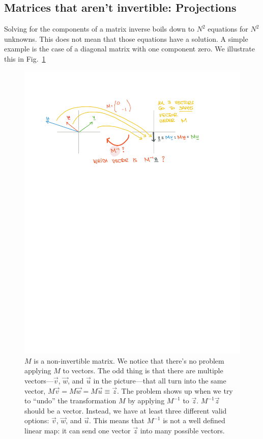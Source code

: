 \documentclass[12pt]{article}
\begin{document}
\subsection{Matrices that aren't invertible: Projections}

Solving for the components of a matrix inverse boils down to $N^2$ equations for $N^2$ unknowns. This does not mean that those equations have a solution. A simple example is the case of a diagonal matrix with one component zero. We illustrate this in Fig.~\ref{fig:map:M:no:inv}
\begin{figure}[tb]
    \centering
    \includegraphics[width=.8\textwidth]{figures/maps_noninv.pdf}
    \caption{$M$ is a non-invertible matrix. We notice that there's no problem applying $M$ to vectors. The odd thing is that there are multiple vectors---$\vec{v}$, $\vec{w}$, and $\vec{u}$ in the picture---that all turn into the same vector, $M\vec{v} = M\vec{w}=M\vec{u}\equiv \vec{z}$. The problem shows up when we try to ``undo'' the transformation $M$ by applying $M^{-1}$ to $\vec{z}$. $M^{-1}\vec{z}$ should be a vector. Instead, we have at least three different valid options: $\vec{v}$, $\vec{w}$, and $\vec{u}$. This means that $M^{-1}$ is not a well defined linear map: it can send one vector $\vec{z}$ into many possible vectors. }
    \label{fig:map:M:no:inv}
\end{figure}
\end{document}
